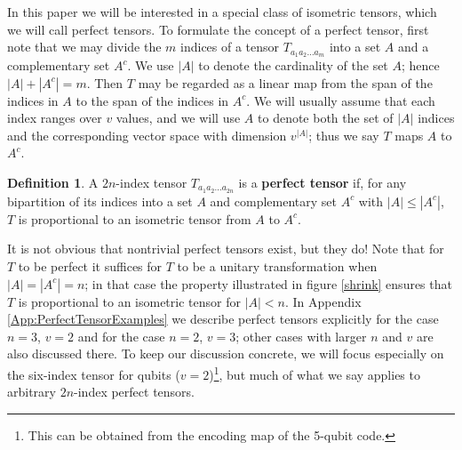 \documentclass[12pt]{article}
\theoremstyle{plain}
\theoremstyle{plain}
\theoremstyle{plain}
\theoremstyle{plain}
\theoremstyle{result}
\theoremstyle{remark}
\theoremstyle{conjecture}
\theoremstyle{observation}
\theoremstyle{definition}
\theoremstyle{corollary}
\theoremstyle{definition}
\theoremstyle{definition}
\newtheorem{definition}{Definition}
\theoremstyle{assumption}
\theoremstyle{definition}
\theoremstyle{problem}
\theoremstyle{fact}
\begin{document}
In this paper we will be interested in a special class of isometric tensors, which we will call perfect tensors. To formulate the concept of a perfect tensor, first note that we may divide the $m$ indices of a tensor $T_{a_1 a_2 \ldots a_m}$ into a set $A$ and a complementary set $A^c$. We use $|A|$ to denote the cardinality of the set $A$; hence $|A|+|A^c| = m$. Then $T$ may be regarded as a linear map from the span of the indices in $A$ to the span of the indices in $A^c$. We will usually assume that each index ranges over $v$ values, and we will use $A$ to denote both the set of $|A|$ indices and the corresponding vector space with dimension $v^{|A|}$; thus we say $T$ maps $A$ to $A^c$.
\begin{definition}
A $2n$-index tensor $T_{a_1a_2\ldots a_{2n}}$ is a \textbf{perfect tensor} if, for any bipartition of its indices into a set $A$ and complementary set $A^c$ with $|A|\leq |A^c|$, $T$ is proportional to an isometric tensor from $A$ to $A^c$.
\end{definition}
It is not obvious that nontrivial perfect tensors exist, but they do! Note that for $T$ to be perfect it suffices for $T$ to be a unitary transformation when $|A|=|A^c| = n$; in that case the property illustrated in figure \ref{shrink} ensures that $T$ is proportional to an isometric tensor for $|A|< n$. 
In Appendix \ref{App:PerfectTensorExamples} we describe perfect tensors explicitly for the case $n=3$, $v=2$ and for the case $n=2$, $v=3$; other cases with larger $n$ and $v$ are also discussed there. 
To keep our discussion concrete, we will focus especially on the six-index tensor for qubits ($v=2$)\footnote{This can be obtained from the encoding map of the 5-qubit code.}, but much of what we say applies to arbitrary $2n$-index perfect tensors. 
\end{document}
